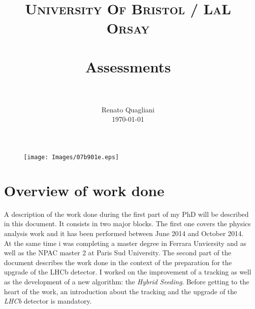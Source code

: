 \documentclass[paper=a4, fontsize=10pt]{scrartcl}
\title{
		\usefont{OT1}{bch}{b}{n}
		\normalfont \normalsize \textsc{University Of Bristol / LaL Orsay} \\ [25pt]
		\horrule{0.5pt} \\[0.4cm]
		\huge Assessments \\
		\horrule{2pt} \\[0.5cm]
}
\author{
		\normalfont 								\normalsize
        Renato Quagliani\\[-3pt]		\normalsize
        \today
}
\date{}
\numberwithin{equation}{section}		%
\numberwithin{figure}{section}			%
\numberwithin{table}{section}				%
\begin{document}
\maketitle
\begin{figure}
\begin{center}
\texttt{[image: Images/07b901e.eps]}
\end{center}
\end{figure}
\section{Overview of work done}
A description of the work done during the first part of my PhD will be described in this document. It consists in two major blocks. The first one covers the physics analysis work and it has been performed between June 2014 and October 2014. At the same time i was completing a master degree in Ferrara Unviersity and as well as the NPAC master 2 at Paris Sud University. The second part of the document describes the work done in the context of the preparation for the upgrade of the LHCb detector. I worked on the improvement of a tracking as well as the development of a new algorithm: the \textit{Hybrid Seeding}.
Before getting to the heart of the work, an introduction about the tracking and the upgrade of the \textit{LHCb} detector is mandatory.
\end{document}
